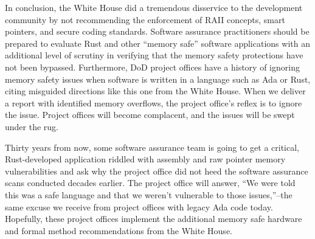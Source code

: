 In conclusion, the White House did a tremendous disservice to the development community by not recommending the enforcement of RAII concepts\autocite{20240902:hood2}, smart pointers, and secure coding standards. Software assurance practitioners should be prepared to evaluate Rust and other ``memory safe'' software applications with an additional level of scrutiny in verifying that the memory safety protections have not been bypassed. Furthermore, DoD project offices have a history of ignoring memory safety issues when software is written in a language such as Ada or Rust, citing misguided directions like this one from the White House. When we deliver a report with identified memory overflows, the project office's reflex is to ignore the issue. Project offices will become complacent, and the issues will be swept under the rug.

Thirty years from now, some software assurance team is going to get a critical, Rust-developed application riddled with assembly and raw pointer memory vulnerabilities and ask why the project office did not heed the software assurance scans conducted decades earlier. The project office will answer, ``We were told this was a safe language and that we weren't vulnerable to those issues,''--the same excuse we receive from project offices with legacy Ada code today. Hopefully, these project offices implement the additional memory safe hardware and formal method recommendations from the White House.
